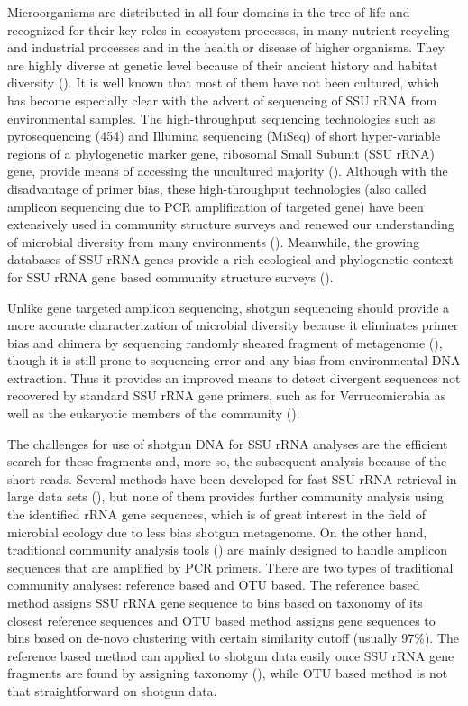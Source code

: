\documentclass[12pt]{article}
\begin{document}
Microorganisms are distributed in all four domains in the tree of life
and recognized for their key roles in ecosystem processes, in many
nutrient recycling and industrial processes and in the health or
disease of higher organisms. They are highly diverse at genetic level
because of their ancient history and habitat diversity
(\cite{ward2002}). It is well known that most of them have not been
cultured, which has become especially clear with the advent of
sequencing of SSU rRNA from environmental samples. The high-throughput
sequencing technologies such as pyrosequencing (454) and Illumina
sequencing (MiSeq) of short hyper-variable regions of a phylogenetic
marker gene, ribosomal Small Subunit (SSU rRNA) gene, provide means of
accessing the uncultured majority (\cite{streit2004}). Although with
the disadvantage of primer bias, these high-throughput technologies
(also called amplicon sequencing due to PCR amplification of targeted
gene) have been extensively used in community structure surveys and
renewed our understanding of microbial diversity from many
environments (\cite{huse2008,caporaso2012miseq}). Meanwhile, the
growing databases of SSU rRNA genes provide a rich ecological and
phylogenetic context for SSU rRNA gene based community structure
surveys (\cite{rdp2009,silva2013}).

Unlike gene targeted amplicon sequencing, shotgun sequencing should
provide a more accurate characterization of microbial diversity
because it eliminates primer bias and chimera by sequencing randomly
sheared fragment of metagenome (\cite{chimeraslayer}), though it is
still prone to sequencing error and any bias from environmental DNA
extraction. Thus it provides an improved means to detect divergent
sequences not recovered by standard SSU rRNA gene primers, such as for
Verrucomicrobia as well as the eukaryotic members of the community
(\cite{baker2003,primereva2008,verruco2011}).

The challenges for use of shotgun DNA for SSU rRNA analyses are the
efficient search for these fragments and, more so, the subsequent
analysis because of the short reads. Several methods have been
developed for fast SSU rRNA retrieval in large data sets
(\cite{ribopicker,metarna,rrnaselector,metaxa}), but none of them
provides further community analysis using the identified rRNA gene
sequences, which is of great interest in the field of microbial
ecology due to less bias shotgun metagenome. On the other hand,
traditional community analysis tools (\cite{rdp2009,mothur,qiime}) are
mainly designed to handle amplicon sequences that are amplified by PCR
primers. There are two types of traditional community analyses:
reference based and OTU based. The reference based method assigns SSU
rRNA gene sequence to bins based on taxonomy of its closest reference
sequences and OTU based method assigns gene sequences to bins based on
de-novo clustering with certain similarity cutoff (usually 97\%). The
reference based method can applied to shotgun data easily once SSU
rRNA gene fragments are found by assigning taxonomy
(\cite{rdpclassifier}), while OTU based method is not that
straightforward on shotgun data.
\end{document}
